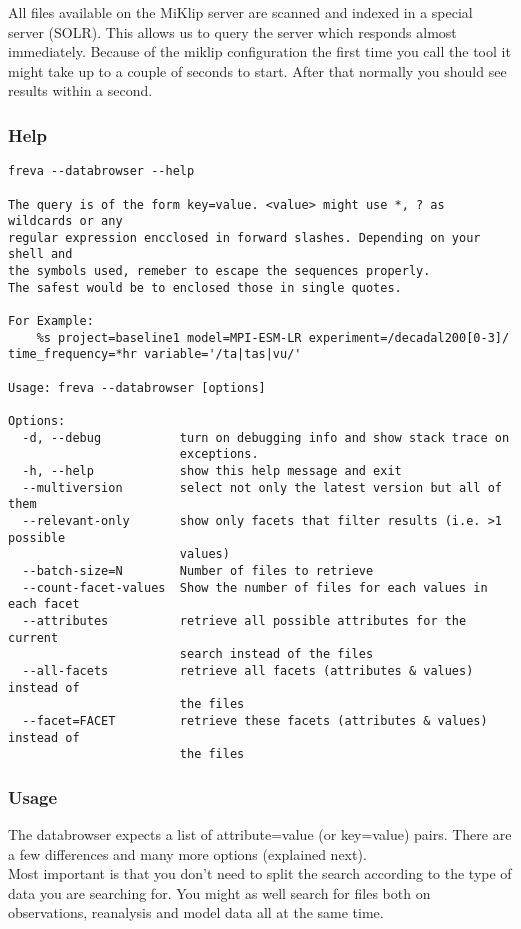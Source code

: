 \documentclass[a4paper,11pt]{ltxdoc}
\begin{document}
All files available on the MiKlip server are scanned and indexed in a special server (SOLR). This allows us to query the server which responds almost immediately. Because of the miklip configuration the first time you call the tool it might take up to a couple of seconds to start. After that normally you should see results within a second.

\subsubsection{Help}
\begin{verbatim}
freva --databrowser --help

The query is of the form key=value. <value> might use *, ? as wildcards or any 
regular expression encclosed in forward slashes. Depending on your shell and 
the symbols used, remeber to escape the sequences properly. 
The safest would be to enclosed those in single quotes.

For Example:
    %s project=baseline1 model=MPI-ESM-LR experiment=/decadal200[0-3]/ 
time_frequency=*hr variable='/ta|tas|vu/'

Usage: freva --databrowser [options]

Options:
  -d, --debug           turn on debugging info and show stack trace on
                        exceptions.
  -h, --help            show this help message and exit
  --multiversion        select not only the latest version but all of them
  --relevant-only       show only facets that filter results (i.e. >1 possible
                        values)
  --batch-size=N        Number of files to retrieve
  --count-facet-values  Show the number of files for each values in each facet
  --attributes          retrieve all possible attributes for the current
                        search instead of the files
  --all-facets          retrieve all facets (attributes & values) instead of
                        the files
  --facet=FACET         retrieve these facets (attributes & values) instead of
                        the files
\end{verbatim}

\subsubsection{Usage}

The databrowser expects a list of attribute=value (or key=value) pairs. There are a few differences and many more options (explained next).\\
Most important is that you don't need to split the search according to the type of data you are searching for. You might as well search for files both on observations, reanalysis and model data all at the same time.\\
\end{document}
